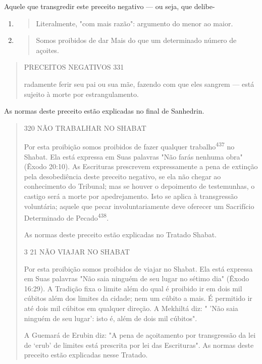 Aquele que transgredir este preceito negativo --- ou seja, que delibe-

\begin{enumerate}
\def\labelenumi{\arabic{enumi}.}
\setcounter{enumi}{434}
\item
  \begin{quote}
  Literalmente, "com mais razão": argumento do menor ao maior.
  \end{quote}
\item
  \begin{quote}
  Somos proibidos de dar Mais do que um determinado número de açoites.
  \end{quote}
\end{enumerate}

\begin{quote}
PRECEITOS NEGATIVOS 331

radamente ferir seu pai ou sua mãe, fazendo com que eles sangrem ---
está su­jeito à morte por estrangulamento.
\end{quote}

As normas deste preceito estão explicadas no final de Sanhedrin.

\begin{quote}
320 NÃO TRABALHAR NO SHABAT

Por esta proibição somos proibidos de fazer qualquer
trabalho\textsuperscript{437} no Shabat. Ela está expressa em Suas
palavras "Não farás nenhuma obra" (Êxodo 20:10). As Escrituras
prescrevem expressamente a pena de extinção pela deso­bediência deste
preceito negativo, se ela não chegar ao conhecimento do Tri­bunal; mas
se houver o depoimento de testemunhas, o castigo será a morte por
apedrejamento. Isto se aplica à transgressão voluntária; aquele que
pecar invo­luntariamente deve oferecer um Sacrifício Determinado de
Pecado\textsuperscript{438}.

As normas deste preceito estão explicadas no Tratado Shabat.

3 21 NÃO VIAJAR NO SHABAT

Por esta proibição somos proibidos de viajar no Shabat. Ela está
ex­pressa em Suas palavras "Não saia ninguém de seu lugar no sétimo dia"
(Êxodo 16:29). A Tradição fixa o limite além do qual é proibido ir em
dois mil cúbitos além dos limites da cidade; nem um cúbito a mais. É
permitido ir até dois mil cúbitos em qualquer direção. A Mekhiltá diz: "
'Não saia ninguém de seu lu­gar': isto é, além de dois mil cúbitos".

A Guemará de Erubin diz: "A pena de açoitamento por transgressão da lei
de `erub' de limites está prescrita por lei das Escrituras". As normas
deste preceito estão explicadas nesse Tratado.
\end{quote}

